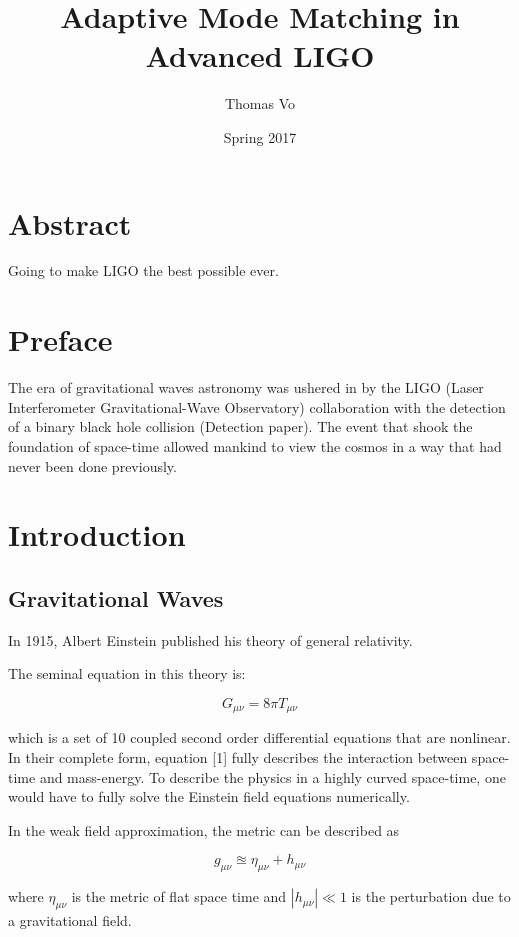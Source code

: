 \documentclass[10pt,a4paper]{book}
\title{Adaptive Mode Matching in Advanced LIGO}
\date{Spring 2017}
\author{Thomas Vo}
\begin{document}
		\chapter*{Abstract}
		Going to make LIGO the best possible ever.
	
	\maketitle
		\chapter*{Preface}
		The era of gravitational waves astronomy was ushered in by the LIGO (Laser Interferometer Gravitational-Wave Observatory) collaboration with the detection of a binary black hole collision (Detection paper).  The event that shook the foundation of space-time allowed mankind to view the cosmos in a way that had never been done previously. 
	\tableofcontents

\chapter{Introduction}
	\section{Gravitational Waves}
	In 1915, Albert Einstein published his theory of general relativity.
	
	The seminal equation in this theory is:
	
	\begin{equation} \label{einstein}
	G_{\mu \nu} = 8 \pi T_{\mu \nu}
	\end{equation}
	
	which is a set of 10 coupled second order differential equations that are nonlinear.  In their complete form, equation [1] fully describes the interaction between space-time and mass-energy. To describe the physics in a highly curved space-time, one would have to fully solve the Einstein field equations numerically.  
	
	
	In the weak field approximation, the metric can be described as
	
	\begin{equation} \label{weak}
	g_{\mu \nu}  \approxeq \eta_{\mu \nu} + h_{\mu \nu}
	\end{equation}
	
	where $\eta_{\mu \nu}$ is the metric of flat space time and $|h_{\mu \nu}| \ll 1$ is the perturbation due to a gravitational field.
	
\end{document}
